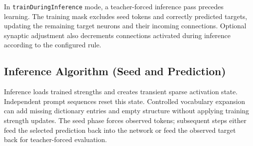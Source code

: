In \texttt{trainDuringInference} mode, a teacher-forced inference pass precedes learning. The training mask excludes seed tokens and correctly predicted targets, updating the remaining target neurons and their incoming connections. Optional synaptic adjustment also decrements connections activated during inference according to the configured rule.

\subsection{Inference Algorithm (Seed and Prediction)}
Inference loads trained strengths and creates transient sparse activation state. Independent prompt sequences reset this state. Controlled vocabulary expansion can add missing dictionary entries and empty structure without applying training strength updates. The seed phase forces observed tokens; subsequent steps either feed the selected prediction back into the network or feed the observed target back for teacher-forced evaluation.

